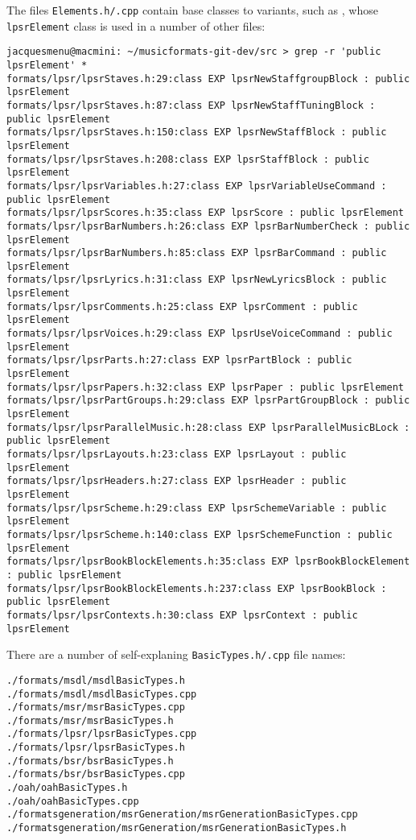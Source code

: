 The files {\tt *Elements.h/.cpp} contain base classes to variants, such as , whose {\tt lpsrElement} class is used in a number of other files:
\begin{lstlisting}[language=Terminal]
jacquesmenu@macmini: ~/musicformats-git-dev/src > grep -r 'public lpsrElement' *
formats/lpsr/lpsrStaves.h:29:class EXP lpsrNewStaffgroupBlock : public lpsrElement
formats/lpsr/lpsrStaves.h:87:class EXP lpsrNewStaffTuningBlock : public lpsrElement
formats/lpsr/lpsrStaves.h:150:class EXP lpsrNewStaffBlock : public lpsrElement
formats/lpsr/lpsrStaves.h:208:class EXP lpsrStaffBlock : public lpsrElement
formats/lpsr/lpsrVariables.h:27:class EXP lpsrVariableUseCommand : public lpsrElement
formats/lpsr/lpsrScores.h:35:class EXP lpsrScore : public lpsrElement
formats/lpsr/lpsrBarNumbers.h:26:class EXP lpsrBarNumberCheck : public lpsrElement
formats/lpsr/lpsrBarNumbers.h:85:class EXP lpsrBarCommand : public lpsrElement
formats/lpsr/lpsrLyrics.h:31:class EXP lpsrNewLyricsBlock : public lpsrElement
formats/lpsr/lpsrComments.h:25:class EXP lpsrComment : public lpsrElement
formats/lpsr/lpsrVoices.h:29:class EXP lpsrUseVoiceCommand : public lpsrElement
formats/lpsr/lpsrParts.h:27:class EXP lpsrPartBlock : public lpsrElement
formats/lpsr/lpsrPapers.h:32:class EXP lpsrPaper : public lpsrElement
formats/lpsr/lpsrPartGroups.h:29:class EXP lpsrPartGroupBlock : public lpsrElement
formats/lpsr/lpsrParallelMusic.h:28:class EXP lpsrParallelMusicBLock : public lpsrElement
formats/lpsr/lpsrLayouts.h:23:class EXP lpsrLayout : public lpsrElement
formats/lpsr/lpsrHeaders.h:27:class EXP lpsrHeader : public lpsrElement
formats/lpsr/lpsrScheme.h:29:class EXP lpsrSchemeVariable : public lpsrElement
formats/lpsr/lpsrScheme.h:140:class EXP lpsrSchemeFunction : public lpsrElement
formats/lpsr/lpsrBookBlockElements.h:35:class EXP lpsrBookBlockElement : public lpsrElement
formats/lpsr/lpsrBookBlockElements.h:237:class EXP lpsrBookBlock : public lpsrElement
formats/lpsr/lpsrContexts.h:30:class EXP lpsrContext : public lpsrElement
\end{lstlisting}

\newpage

There are a number of self-explaning {\tt *BasicTypes.h/.cpp} file names:%
\begin{lstlisting}[language=Terminal]
./formats/msdl/msdlBasicTypes.h
./formats/msdl/msdlBasicTypes.cpp
./formats/msr/msrBasicTypes.cpp
./formats/msr/msrBasicTypes.h
./formats/lpsr/lpsrBasicTypes.cpp
./formats/lpsr/lpsrBasicTypes.h
./formats/bsr/bsrBasicTypes.h
./formats/bsr/bsrBasicTypes.cpp
./oah/oahBasicTypes.h
./oah/oahBasicTypes.cpp
./formatsgeneration/msrGeneration/msrGenerationBasicTypes.cpp
./formatsgeneration/msrGeneration/msrGenerationBasicTypes.h
\end{lstlisting}


